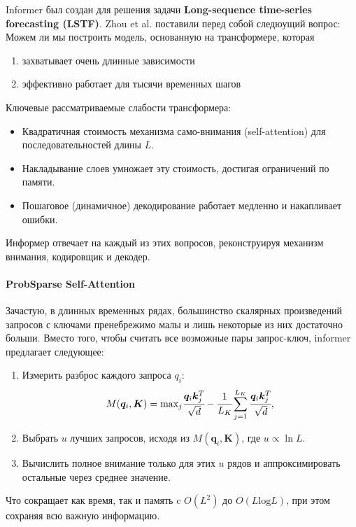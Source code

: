 Informer был создан для решения задачи 
\textbf{Long-sequence time-series forecasting (LSTF)}. 
Zhou et al. поставили перед собой следюущий вопрос: 
Можем ли мы построить модель, основанную на трансформере, 
которая 
\begin{enumerate}[label=(\alph*)]
    \item захватывает очень длинные зависимости
    \item эффективно работает для тысячи временных шагов
\end{enumerate}
Ключевые рассматриваемые слабости трансформера:
\begin{itemize}
    \item Квадратичная стоимость механизма само-внимания (self-attention) 
    для последовательностей длины $L$.
    \item Накладывание слоев умножает эту стоимость, достигая ограничений по памяти.
    \item Пошаговое (динамичное) декодирование работает медленно и накапливает ошибки. 
\end{itemize}

Информер отвечает на каждый из этих вопросов, реконструируя 
механизм внимания, кодировщик и декодер.

\paragraph{ProbSparse Self-Attention}

Зачастую, в длинных временных рядах, большинство 
скалярных произведений запросов с ключами пренебрежимо малы 
и лишь некоторые из них достаточно больши. 
Вместо того, чтобы считать все возможные пары запрос-ключ, 
informer предлагает следующее:
\begin{enumerate}
    \item Измерить разброс каждого запроса $q_i$:
    \begin{equation*}
        M(\bm{q}_i, \bm{K}) = \text{max}_j \cfrac{\bm{q}_i \bm{k}_j^T}{\sqrt{d}} - 
        \cfrac{1}{L_K} \sum_{j=1}^{L_K} \cfrac{\bm{q}_i \bm{k}_j^T}{\sqrt{d}}, 
    \end{equation*}
    \item Выбрать $u$ лучших запросов, исходя из $M(\bm{q}_i, \bm{K})$, 
    где $u \propto \ln L$.
    \item Вычислить полное внимание только для этих $u$ рядов и 
    аппроксимировать остальные через среднее значение.
\end{enumerate}
Что сокращает как время, так и память c $O(L^2)$ до $O(L \text{log} L)$, 
при этом сохраняя всю важную информацию.

